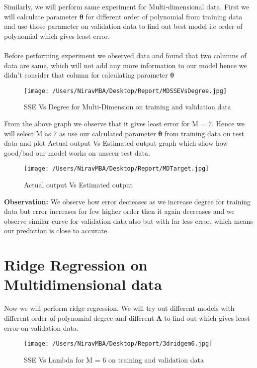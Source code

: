 \documentclass[12pt]{report}
\begin{document}
Similarly, we will perform same experiment for Multi-dimensional data. First we will calculate parameter $ \mathbf{\theta} $ for different order of polynomial from training data and use those parameter on validation data to find out best model i.e order of polynomial which gives least error.\\ \\ 
Before performing experiment we observed data and found that two columns of data are same, which will not add any more information to our model hence we didn't consider that column for calculating parameter $ \mathbf{\theta} $\\

\begin{figure}[H]
	\centering
	\texttt{[image: /Users/NiravMBA/Desktop/Report/MDSSEVsDegree.jpg]}
	\caption{SSE Vs Degree for Multi-Dimension on training and validation data} 
\end{figure}

From the above graph we observe that it gives least error for M = 7. Hence we will select M as 7 as use our calculated parameter $ \mathbf{\theta} $ from training data on test data and plot Actual output Vs Estimated output graph which show how good/bad our model works on unseen test data.\\

\begin{figure}[H]
	\centering
	\texttt{[image: /Users/NiravMBA/Desktop/Report/MDTarget.jpg]}
	\caption{Actual output Vs Estimated output} 
\end{figure}

{\bfseries Observation: } 
We observe how error decreases as we increase degree for training data but error increases for few higher order then it again decreases and we observe similar curve for validation data also but with far less error, which means our prediction is close to accurate.

\section{Ridge Regression on Multidimensional data}

Now we will perform ridge regression, We will try out different models with different order of polynomial degree and different  $ \mathbf{\Lambda} $ to find out which gives least error on validation data.


\begin{figure}[H]
	\centering
	\texttt{[image: /Users/NiravMBA/Desktop/Report/3dridgem6.jpg]}
	\caption{SSE Vs Lambda for M = 6 on training and validation data} 
\end{figure}
\end{document}
